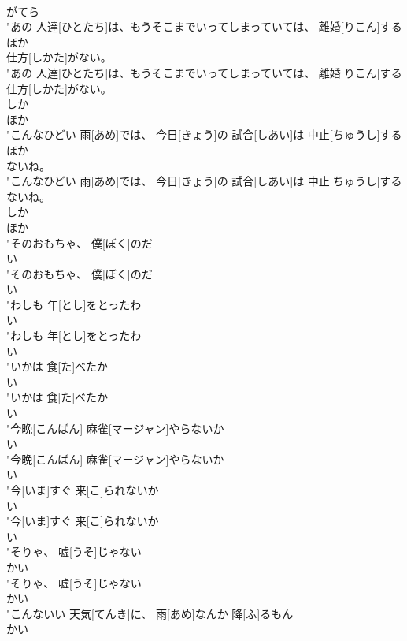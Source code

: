 \documentclass[8pt]{extreport}
\begin{document}
\begin{CJK}{UTF8}{min}
\\	がてら
\\	"あの 人達[ひとたち]は、もうそこまでいってしまっていては、 離婚[りこん]する
\\	ほか
\\	仕方[しかた]がない。
\\	"あの 人達[ひとたち]は、もうそこまでいってしまっていては、 離婚[りこん]する
\\	仕方[しかた]がない。
\\	しか	
\\	ほか
\\	"こんなひどい 雨[あめ]では、 今日[きょう]の 試合[しあい]は 中止[ちゅうし]する
\\	ほか
\\	ないね。
\\	"こんなひどい 雨[あめ]では、 今日[きょう]の 試合[しあい]は 中止[ちゅうし]する
\\	ないね。
\\	しか	
\\	ほか
\\	"そのおもちゃ、 僕[ぼく]のだ
\\	い
\\	"そのおもちゃ、 僕[ぼく]のだ
\\	い
\\	"わしも 年[とし]をとったわ
\\	い
\\	"わしも 年[とし]をとったわ
\\	い
\\	"いかは 食[た]べたか
\\	い
\\	"いかは 食[た]べたか
\\	い
\\	"今晩[こんばん] 麻雀[マージャン]やらないか
\\	い
\\	"今晩[こんばん] 麻雀[マージャン]やらないか
\\	い
\\	"今[いま]すぐ 来[こ]られないか
\\	い
\\	"今[いま]すぐ 来[こ]られないか
\\	い
\\	"そりゃ、 嘘[うそ]じゃない
\\	かい
\\	"そりゃ、 嘘[うそ]じゃない
\\	かい
\\	"こんないい 天気[てんき]に、 雨[あめ]なんか 降[ふ]るもん
\\	かい

\end{CJK}
\end{document}
